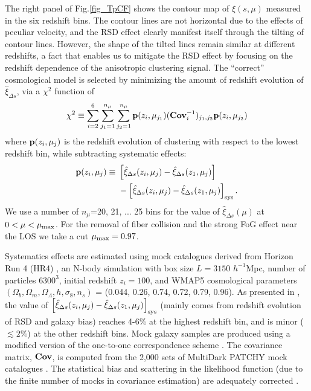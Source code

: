 \documentclass[prl,twocolumn,superscriptaddress,aps,amsmath,amssymb,nofootinbib,altaffilletter]{revtex4}
\begin{document}
The right panel of Fig.\ref{fig_TpCF} shows the contour map of $\xi(s,\mu)$ measured in the six redshift bins.
The contour lines are not horizontal due to the effects of peculiar velocity,
and the RSD effect clearly manifest itself through the tilting of contour lines.
However, the shape of the tilted lines remain similar at different redshifts, a fact that enables us  to mitigate the RSD effect by focusing on the redshift dependence of the anisotropic clustering signal.
The ``correct'' cosmological model is selected by minimizing the amount of redshift evolution of $\hat\xi_{\Delta s}$,
via a $\chi^2$ function of 
\begin{equation}
 \chi^2\equiv \sum_{i=2}^{6} \sum_{j_1=1}^{n_{\mu}} \sum_{j_2=1}^{n_{\mu}} {\bf p}(z_i,\mu_{j_1}) ({\bf Cov}_{i}^{-1})_{j_1,j_2}  {\bf p}(z_i,\mu_{j_2})
\end{equation}
where ${\bf p}(z_i,\mu_{j})$ is the redshift evolution of clustering with respect to the lowest redshift bin,
while subtracting systematic effects:
\begin{eqnarray}
 {\bf p}(z_i,\mu_{j}) \equiv\ & \left[\hat\xi_{\Delta s}(z_i,\mu_j)-\hat\xi_{\Delta s}(z_1,\mu_j)\right] \\ \nonumber
 &- \left[\hat\xi_{\Delta s}(z_i,\mu_j)-\hat\xi_{\Delta s}(z_1,\mu_j)\right]_{\rm sys}.
\end{eqnarray}
We use a number of $n_{\mu}$=20, 21, ... 25 bins for the value of $\hat\xi_{\Delta s}(\mu)$ at $0<\mu<\mu_{\rm max}$.
For the removal of fiber collision and the strong FoG effect near the LOS we take a cut $\mu_{\rm max} = 0.97$.

Systematics effects are estimated using mock catalogues derived from Horizon Run 4 (HR4) \cite{HR4},
an N-body simulation with box size $L={3150}$ $h^{-1}$Mpc, number of particles $6300^3$,   
initial redshift $z_{i}=100$, and WMAP5\citep{komatsu2011} cosmological parameters 
$(\Omega_{b},\Omega_{m},\Omega_\Lambda,h,\sigma_8,n_s)$  = (0.044, 0.26, 0.74, 0.72, 0.79, 0.96). 
As presented in \cite{Li2016}, the value of $\left[\hat\xi_{\Delta s}(z_i,\mu_j)-\hat\xi_{\Delta s}(z_1,\mu_j)\right]_{\rm sys}$
(mainly comes from redshift evolution of RSD and galaxy bias)
reaches 4-6\% at the highest redshift bin,
and is minor ($\lesssim2\%$) at the other redshift bins.
Mock galaxy samples are produced using a modified version of the one-to-one correspondence scheme \citep{hong2016}. 
The covariance matrix, ${\bf Cov}$, is computed from the 2,000 sets of MultiDark PATCHY mock catalogues \citep{MDPATCHY}.
The statistical bias and scattering in the likelihood function (due to the finite number of mocks in covariance estimation) 
are adequately corrected \citep{Hartlap,Percival2014}.
\end{document}
